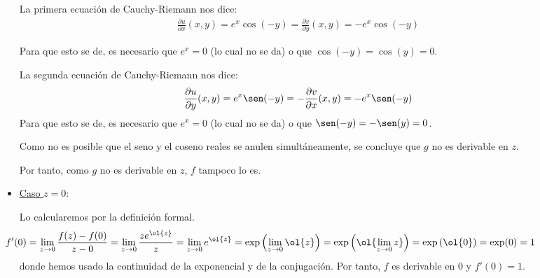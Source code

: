 \documentclass[12pt]{article}
\renewcommand{\Re}{\operatorname{Re}} %
\renewcommand{\Im}{\operatorname{Im}}
\begin{document}
\begin{ejercicio}[3 puntos]
\begin{description}
\begin{itemize}
                La primera ecuación de Cauchy-Riemann nos dice:
                \begin{align*}
                    \frac{\partial u}{\partial x}(x,y) = e^x\cos(-y)
                    = \frac{\partial v}{\partial y}(x,y) = -e^x\cos(-y)
                \end{align*}

                Para que esto se de, es necesario que $e^x=0$ (lo cual no se da) o que $\cos(-y)=\cos(y)=0$.

                La segunda ecuación de Cauchy-Riemann nos dice:
                \begin{align*}
                    \frac{\partial u}{\partial y}(x,y) = e^x\sen(-y)
                    = -\frac{\partial v}{\partial x}(x,y) = -e^x\sen(-y)
                \end{align*}
                Para que esto se de, es necesario que $e^x=0$ (lo cual no se da) o que $\sen(-y)=-\sen(y)=0$.

                Como no es posible que el seno y el coseno reales se anulen simultáneamente, se concluye que $g$ no es derivable en $z$.

                \begin{comment}
                \item[Otra forma]~
                
                Calculemos $\ol{g(z)}$:
                \begin{align*}
                    \ol{g(z)} &= \ol{e^{\ol{z}}} = e^{\Re z}\left(\cos(-\Im z) - i\sen(-\Im z)\right)
                    =\\&= e^{\Re z}\left(\cos(\Im z) + i\sen(\Im z)\right)
                    = e^z\qquad \forall z\in \mathbb{C}
                \end{align*}

                Por tanto, supuesto que $g$ es holomorfa en $\bb{C}^*$, como $\ol{g}$ también lo es, entonces 
                \end{comment}
            
            
            Por tanto, como $g$ no es derivable en $z$, $f$ tampoco lo es.

            \item{ \ul{Caso $z=0$}:}
            
            Lo calcularemos por la definición formal.
            \begin{equation*}
                \hspace{-2cm}f'(0) = \lim_{z\to 0} \frac{f(z)-f(0)}{z-0} = \lim_{z\to 0} \frac{z e^{\ol{z}}}{z} = \lim_{z\to 0} e^{\ol{z}} = \exp\left(\lim_{z\to 0} \ol{z}\right) = \exp\left(\ol{\lim_{z\to 0} z}\right) = \exp\left(\ol{0}\right) = \exp(0) = 1
            \end{equation*}
            donde hemos usado la continuidad de la exponencial y de la conjugación. Por tanto, $f$ es derivable en $0$ y $f'(0)=1$.
        \end{itemize}
        

\end{description}
\end{ejercicio}
\end{document}
